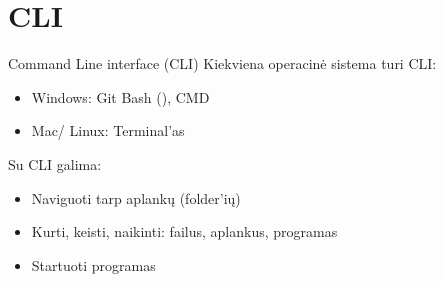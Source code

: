 \documentclass[11pt,xcolor=table]{beamer}
\begin{document}
\section{CLI}
\begin{frame}{Command Line interface (CLI)}
Kiekviena operacinė sistema turi CLI:
\begin{itemize}
\item Windows: Git Bash (), CMD
\item Mac/ Linux: Terminal'as
\end{itemize}
Su CLI galima:
\begin{itemize}
\item Naviguoti tarp aplankų (folder'ių)
\item Kurti, keisti, naikinti: failus, aplankus, programas
\item Startuoti programas
\end{itemize}
\end{frame}
\end{document}
